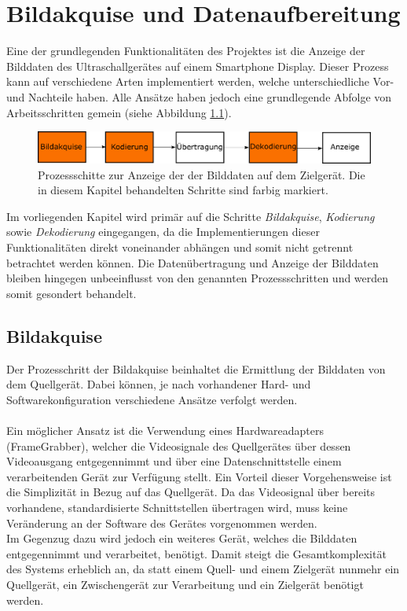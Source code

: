\chapter{Bildakquise und Datenaufbereitung}
Eine der grundlegenden Funktionalitäten des Projektes ist die Anzeige der Bilddaten des Ultraschallgerätes auf einem Smartphone Display. Dieser Prozess kann auf verschiedene Arten implementiert werden, welche unterschiedliche Vor- und Nachteile haben. Alle Ansätze haben jedoch eine grundlegende Abfolge von Arbeitsschritten gemein (siehe Abbildung \ref{fig:Bildakquise_schritte}).\\

\begin{figure}[h]
	\centering
	\includegraphics[width=1\textwidth]{Bilder/BildakquiseUndDatenaufbereitung/Bildakquise_schritte.pdf}
	\caption{Prozessschitte zur Anzeige der der Bilddaten auf dem Zielgerät. Die in diesem Kapitel behandelten Schritte sind farbig markiert.}
	\label{fig:Bildakquise_schritte}
\end{figure}

Im vorliegenden Kapitel wird primär auf die Schritte \textit{Bildakquise}, \textit{Kodierung} sowie \textit{Dekodierung} eingegangen, da die Implementierungen dieser Funktionalitäten direkt voneinander abhängen und somit nicht getrennt betrachtet werden können. Die Datenübertragung und Anzeige der Bilddaten bleiben hingegen unbeeinflusst von den genannten Prozessschritten und werden somit gesondert behandelt.\\

\section{Bildakquise}
Der Prozesschritt der Bildakquise beinhaltet die Ermittlung der Bilddaten von dem Quellgerät. Dabei können, je nach vorhandener Hard- und Softwarekonfiguration verschiedene Ansätze verfolgt werden.\\
\\
Ein möglicher Ansatz ist die Verwendung eines Hardwareadapters (\glqq FrameGrabber\grqq), welcher die Videosignale des Quellgerätes über dessen Videoausgang entgegennimmt und über eine Datenschnittstelle einem verarbeitenden Gerät zur Verfügung stellt. Ein Vorteil dieser Vorgehensweise ist die Simplizität in Bezug auf das Quellgerät. Da das Videosignal über bereits vorhandene, standardisierte Schnittstellen übertragen wird, muss keine Veränderung an der Software des Gerätes vorgenommen werden.\\
Im Gegenzug dazu wird jedoch ein weiteres Gerät, welches die Bilddaten entgegennimmt und verarbeitet, benötigt. Damit steigt die Gesamtkomplexität des Systems erheblich an, da statt einem Quell- und einem Zielgerät nunmehr ein Quellgerät, ein Zwischengerät zur Verarbeitung und ein Zielgerät benötigt werden.\\


